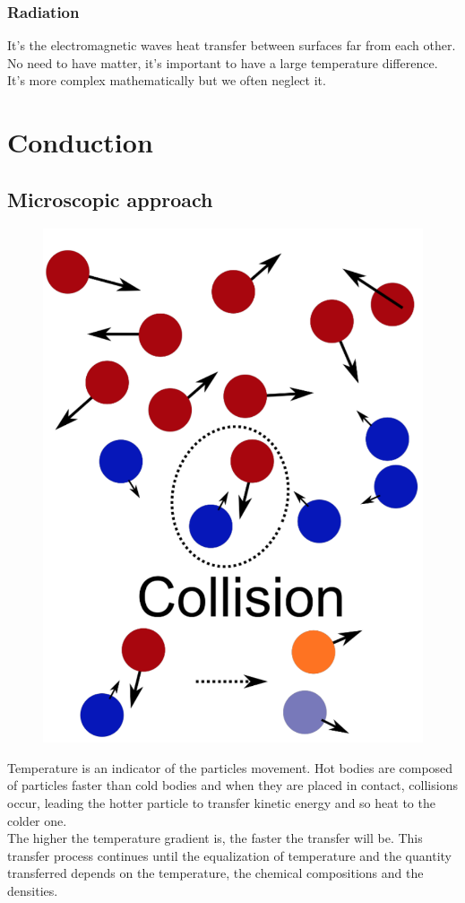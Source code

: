 		\subsubsection{Radiation}
		It's the electromagnetic waves heat transfer between surfaces far from each other. No need to have matter, it's important to have a large temperature difference. It's more complex mathematically but we often neglect it.
		
	\section{Conduction}
		\subsection{Microscopic approach}
			\begin{figure}
 			\vspace{-5mm}
 			\includegraphics[scale=0.2]{ch3/3}
 			\end{figure}
 			Temperature is an indicator of the particles movement. Hot bodies are composed of particles faster than cold bodies and when they are placed in contact, collisions occur, leading the hotter particle to transfer kinetic energy and so heat to the colder one. \\
 			The higher the temperature gradient is, the faster the transfer will be. This transfer process continues until the equalization of temperature and the quantity transferred depends on the temperature, the chemical compositions and the densities.
 			
